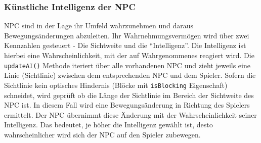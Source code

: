 \subsubsection{Künstliche Intelligenz der NPC}
\label{subsub:architektur:ki}
NPC sind in der Lage ihr Umfeld wahrzunehmen und daraus Bewegungsänderungen abzuleiten.
Ihr Wahrnehmungsvermögen wird über zwei Kennzahlen gesteuert - Die Sichtweite und die ``Intelligenz''.
Die Intelligenz ist hierbei eine Wahrscheinlichkeit, mit der auf Wahrgenommenes reagiert wird.
Die \texttt{updateAI()} Methode iteriert über alle vorhandenen NPC und zieht jeweils eine Linie (Sichtlinie) zwischen dem entsprechenden NPC und dem Spieler.
Sofern die Sichtlinie kein optisches Hindernis (Blöcke mit \texttt{isBlocking} Eigenschaft) schneidet, wird geprüft ob die Länge der Sichtlinie im Bereich der Sichtweite des NPC ist.
In diesem Fall wird eine Bewegungsänderung in Richtung des Spielers ermittelt.
Der NPC übernimmt diese Änderung mit der Wahrscheinlichkeit seiner Intelligenz. 
Das bedeutet, je höher die Intelligenz gewählt ist, desto wahrscheinlicher wird sich der NPC auf den Spieler zubewegen.